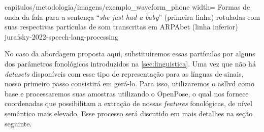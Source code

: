 {capitulos/metodologia/imagens/exemplo_waveform_phone}
{width=\textwidth}
{Formas de onda da fala para a sentença ``\textit{she just had a baby}'' (primeira linha) rotuladas com suas respectivas partículas de som transcritas em ARPAbet (linha inferior)}
{jurafsky-2022-speech-lang-processing}






No caso da abordagem proposta aqui, substituiremos essas partículas por alguns dos parâmetros fonológicos introduzidos na \autoref{sec:linguistica}. Uma vez que não há \textit{datasets} disponíveis com esse tipo de representação para as línguas de sinais, nosso primeiro passo consistirá em gerá-lo. Para isso, utilizaremos o \acrshort{asllvd} como base e processaremos suas amostras utilizando o OpenPose, o qual nos fornece coordenadas que possibilitam a extração de nossas \textit{features} fonológicas, de nível semântico mais elevado.
Esse processo será discutido em mais detalhes na seção seguinte.





